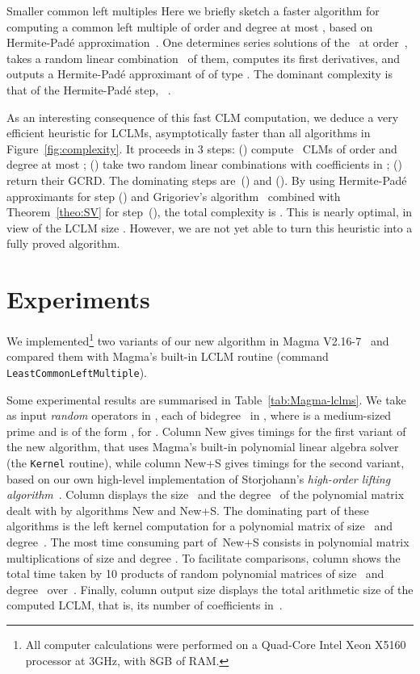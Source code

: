 \documentclass{sig-alt-full}
\begin{document}
\begin{section}{\!\!\!\! Smaller common left multiples}
Here we briefly sketch a faster algorithm for computing a common left multiple
of order and degree at most , based on Hermite-Pad\'e
approximation~\cite[Chapter~10]{Bostan03}. One determines series
solutions of the~ at order~, takes a random linear
combination~ of them, computes its first  derivatives, and outputs a
Hermite-Padé approximant of  of type . The dominant complexity is that of the Hermite-Padé step,
~\cite{Storjohann06}.

\medskip {} 
As an interesting consequence of this fast CLM computation, we
deduce a very efficient heuristic for LCLMs, asymptotically
faster than all algorithms in Figure~\ref{fig:complexity}. It proceeds in 3 steps:
() compute~ CLMs of order and degree at most ;
() take two random linear combinations with coefficients in ; ()
return their GCRD. The dominating steps are~() and (). By using
Hermite-Padé approximants for step () and Grigoriev's
algorithm~\cite{Grigoriev90} combined with Theorem~\ref{theo:SV} for step~(), the total complexity is
. This is nearly optimal, in view of
the LCLM size . 
However, we are not yet able to turn this heuristic into a fully proved algorithm.

\end{section}



\vspace{-0.1cm}

\section{Experiments}

We implemented\footnote{All computer calculations were performed on a
Quad-Core Intel Xeon X5160 processor at 3GHz, with 8GB of RAM.} two variants
of our new algorithm in Magma V2.16-7~\cite{magma} and compared them with
Magma's built-in LCLM routine (command \verb+LeastCommonLeftMultiple+).

Some experimental results are summarised in Table~\ref{tab:Magma-lclms}. We
take as input  \emph{random\/} operators in ,
each of bidegree~ in , where  is a medium-sized
prime and  is of the form , for .
Column {\sf New} gives timings for the first variant of the new algorithm,
that uses Magma's built-in polynomial linear algebra solver (the \verb+Kernel+
routine), while column {\sf New+S} gives timings for the second variant, based
on our own high-level implementation of Storjohann's \emph{high-order lifting
algorithm}~\cite{Storjohann03}. Column  displays the size~ and the
degree~ of the polynomial matrix dealt with by algorithms {\sf New} and
{\sf New+S}. The dominating part of these algorithms is the left kernel
computation for a polynomial matrix of size~ and degree~.
The most time consuming part of~{\sf New+S} consists in  polynomial
matrix multiplications of size  and degree . To facilitate comparisons,
column  shows the total time taken by 10 products of random
polynomial matrices of size~ and degree~ over~. Finally, column
{\sf output size} displays the total arithmetic size of the computed LCLM,
that is, its number of coefficients in~.
\end{document}
